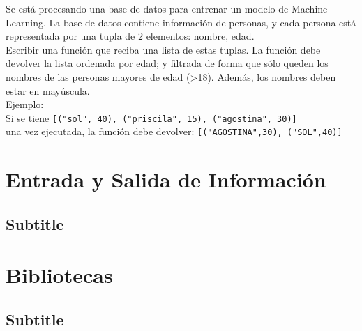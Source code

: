 \documentclass[
  letterpaper,
  DIV=11,
  numbers=noendperiod]{scrreprt}
\begin{document}
\begin{tcolorbox}[enhanced jigsaw, colframe=quarto-callout-important-color-frame, opacityback=0, opacitybacktitle=0.6, bottomrule=.15mm, toprule=.15mm, coltitle=black, breakable, colback=white, leftrule=.75mm, titlerule=0mm, bottomtitle=1mm, toptitle=1mm, rightrule=.15mm, title=\textcolor{quarto-callout-important-color}{\faExclamation}\hspace{0.5em}{Ejercicio Desafío}, arc=.35mm, left=2mm, colbacktitle=quarto-callout-important-color!10!white]

Se está procesando una base de datos para entrenar un modelo de Machine
Learning. La base de datos contiene información de personas, y cada
persona está representada por una tupla de 2 elementos: nombre, edad.\\
Escribir una función que reciba una lista de estas tuplas. La función
debe devolver la lista ordenada por edad; y filtrada de forma que sólo
queden los nombres de las personas mayores de edad (\textgreater18).
Además, los nombres deben estar en mayúscula.\\
Ejemplo:\\
Si se tiene
\texttt{{[}("sol",\ 40),\ ("priscila",\ 15),\ ("agostina",\ 30){]}}\\
una vez ejecutada, la función debe devolver:
\texttt{{[}("AGOSTINA",30),\ ("SOL",40){]}}

\end{tcolorbox}


\hypertarget{entrada-y-salida-de-informaciuxf3n}{%
\chapter{Entrada y Salida de
Información}\label{entrada-y-salida-de-informaciuxf3n}}

\hypertarget{subtitle}{%
\section{Subtitle}\label{subtitle}}


\hypertarget{bibliotecas}{%
\chapter{Bibliotecas}\label{bibliotecas}}

\hypertarget{subtitle-1}{%
\section{Subtitle}\label{subtitle-1}}
\end{document}
